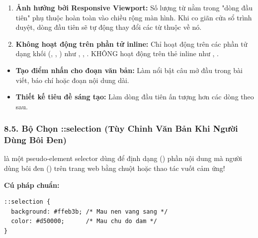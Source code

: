 \begin{tipBox}
\begin{enumerate}[leftmargin=1.5em, itemsep=3pt, parsep=0pt]
    \item \textbf{Ảnh hưởng bởi Responsive Viewport:} Số lượng từ nằm trong "dòng đầu tiên" phụ thuộc hoàn toàn vào chiều rộng màn hình. Khi co giãn cửa sổ trình duyệt, dòng đầu tiên sẽ tự động thay đổi các từ thuộc về nó.
    \item \textbf{Không hoạt động trên phần tử inline:} Chỉ hoạt động trên các phần tử dạng khối (, , ) như , , . KHÔNG hoạt động trên thẻ inline như , .
\end{enumerate}
\end{tipBox}

\begin{conceptBox}
\begin{itemize}[leftmargin=1.5em, itemsep=3pt, parsep=0pt]
    \item \textbf{Tạo điểm nhấn cho đoạn văn bản:} Làm nổi bật câu mở đầu trong bài viết, báo chí hoặc đoạn nội dung dài.
    \item \textbf{Thiết kế tiêu đề sáng tạo:} Làm dòng đầu tiên ấn tượng hơn các dòng theo sau.
\end{itemize}
\end{conceptBox}

\subsubsection{8.5. Bộ Chọn ::selection (Tùy Chỉnh Văn Bản Khi Người Dùng Bôi Đen)}

\begin{conceptBox}
 là một pseudo-element selector dùng để định dạng () phần nội dung mà người dùng bôi đen () trên trang web bằng chuột hoặc thao tác vuốt cảm ứng!
\par\vspace{4pt}
\textbf{Cú pháp chuẩn:}
\begin{codeWindow}
\begin{lstlisting}[language=CSS3]
::selection {
  background: #ffeb3b; /* Mau nen vang sang */
  color: #d50000;      /* Mau chu do dam */
}
\end{lstlisting}
\end{codeWindow}
\end{conceptBox}

